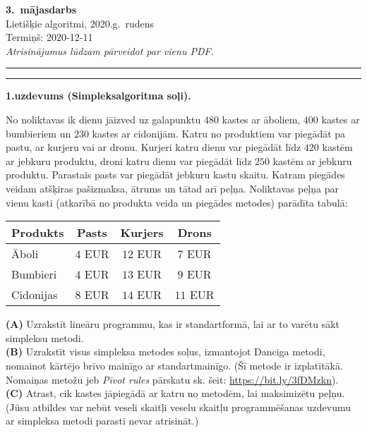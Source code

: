 \documentclass[a4paper,12pt]{article}
\begin{document}
\thispagestyle{empty}

\begin{center}
{\bf\Huge 3.\ mājasdarbs} \\[5pt]
Lietišķie algoritmi, 2020.g.\ rudens \\
Termiņš: 2020-12-11\\[5pt]
{\em Atrisinājumus lūdzam pārveidot par vienu PDF.}
\end{center}

\hrule
\vspace{2pt}
\hrule
\vspace{12pt}



\vspace{10pt}
{\bf 1.uzdevums (Simpleksalgoritma soļi).}

No noliktavas ik dienu jāizved uz galapunktu $480$ kastes
ar āboliem, $400$ kastes ar bumbieriem un $230$ kastes ar cidonijām. 
Katru no produktiem var piegādāt pa pastu, ar kurjeru vai ar dronu. 
Kurjeri katru dienu var piegādāt līdz $420$ kastēm ar jebkuru produktu, 
droni katru dienu var pie\-gā\-dāt līdz $250$ kastēm ar jebkuru produktu. 
Parastais pasts var piegādāt jebkuru kastu skaitu. 
Katram piegādes veidam atšķiras pašizmaksa, āt\-rums un tātad \textendash{} arī 
peļņa. Noliktavas peļņa par vienu kasti (atkarībā no produkta veida 
un pie\-gā\-des metodes) 
parādīta tabulā: 

\vspace{4pt}
\begin{tabular}{|l|c|c|c|} \hline
Produkts & Pasts & Kurjers & Drons \\ \hline
Āboli & $4$ EUR & $12$ EUR & $7$ EUR \\ \hline
Bumbieri & $4$ EUR & $13$ EUR & $9$ EUR \\ \hline
Cidonijas & $8$ EUR & $14$ EUR & $11$ EUR \\ \hline
\end{tabular}

\vspace{4pt}
{\bf (A)} Uzrakstīt lineāru programmu, kas ir standartformā, lai ar to varētu sākt simpleksu metodi.\\
{\bf (B)} Uzrakstīt visus simpleksa metodes soļus, izmantojot Danciga metodi, nomainot kārtējo brī\-vo mainīgo 
ar standartmainīgo. (Šī metode ir izplatītākā. Nomaiņas metožu jeb {\em Pivot rules} pār\-ska\-tu sk. 
šeit: \url{https://bit.ly/3fDMzkn}).\\
{\bf (C)} Atrast, cik kastes jāpiegādā ar katru no me\-to\-dēm, lai maksimizētu peļņu. 
(Jūsu atbildes var nebūt veseli skaitļi \textendash{} veselu skaitļu programmēšanas uzdevumu 
ar simpleksa metodi parasti nevar atrisināt.) 
\end{document}
